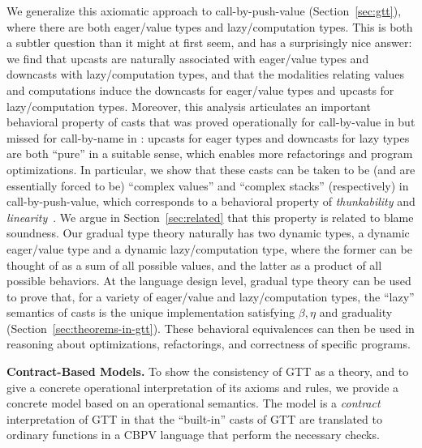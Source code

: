 \documentclass[acmsmall,nonacm]{acmart}
\begin{document}
We generalize this axiomatic approach to call-by-push-value
(Section~\ref{sec:gtt}), where there are both eager/value types and
lazy/computation types. This is both a subtler question than it might at
first seem, and has a surprisingly nice answer: we find that upcasts are
naturally associated with eager/value types and downcasts with
lazy/computation types, and that the modalities relating values and
computations induce the downcasts for eager/value types and upcasts for
lazy/computation types.  Moreover, this analysis articulates an
important behavioral property of casts that was proved operationally for
call-by-value in \citep{newahmed18} but missed for call-by-name in
\citep{newlicata2018-fscd}: upcasts for eager types and downcasts for
lazy types are both ``pure'' in a suitable sense, which enables more
refactorings and program optimizations.  In particular, we show that
these casts can be taken to be (and are essentially forced to be)
``complex values'' and ``complex stacks'' (respectively) in
call-by-push-value, which corresponds to a behavioral property of
\emph{thunkability} and
\emph{linearity}~\cite{munchmaccagnoni14nonassociative}.  We argue in
Section~\ref{sec:related} that this property is related to blame
soundness.  Our gradual type theory naturally has two dynamic types, a
dynamic eager/value type and a dynamic lazy/computation type, where the
former can be thought of as a sum of all possible values, and the latter
as a product of all possible behaviors.  At the language design level,
gradual type theory can be used to prove that, for a variety of
eager/value and lazy/computation types, the ``lazy'' semantics of casts
is the unique implementation satisfying $\beta,\eta$ and graduality
(Section~\ref{sec:theorems-in-gtt}). These behavioral equivalences can
then be used in reasoning about optimizations, refactorings, and
correctness of specific programs.

\textbf{Contract-Based Models.}
To show the consistency of GTT as a theory, and to give a concrete
operational interpretation of its axioms and rules, we provide a
concrete model based on an operational semantics.
%
The model is a \emph{contract} interpretation of GTT in that the
``built-in'' casts of GTT are translated to ordinary functions in a
CBPV language that perform the necessary checks.  
%
\end{document}
